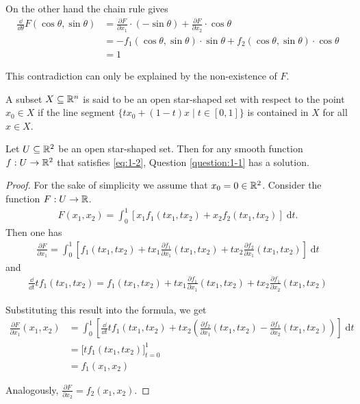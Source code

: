 On the other hand the chain rule gives
\begin{align*}
  \frac{\dd }{\dd\theta} F(\cos\theta, \sin\theta) 
  & = \frac{\partial F}{\partial x_1}\cdot (-\sin\theta) + \frac{\partial F}{\partial x_2}\cdot \cos\theta \\
  & = -f_1 (\cos\theta, \sin\theta)\cdot\sin\theta + f_2(\cos\theta, \sin\theta)\cdot \cos\theta\\
  & = 1
\end{align*}

This contradiction can only be explained by the non-existence of $F$.

\begin{definition}
  A subset $X\subseteq {\ensuremath{\mathbb{R}}}^n$ is said to be an open star-shaped set with respect to the point $x_0\in X$ if
  the line segment $\{tx_0+(1-t)x\mid t\in[0,1]\}$ is contained in $X$ for all $x\in X$.
\end{definition}

\begin{theorem}\label{theorem:1-4}
  Let $U\subseteq {\ensuremath{\mathbb{R}}}^2$ be an open star-shaped set. Then for any smooth function $f:U\to {\ensuremath{\mathbb{R}}}^2$ that satisfies
  \eqref{eq:1-2}, Question \ref{question:1-1} has a solution.
\end{theorem}

\begin{proof}
  For the sake of simplicity we assume that $x_0=0\in{\ensuremath{\mathbb{R}}}^2$. Consider the function $F:U\to {\ensuremath{\mathbb{R}}}$.
  \begin{align*}
    F(x_1, x_2) = \int_{0}^{1}{\left[ x_1f_1(tx_1, tx_2) + x_2f_2(tx_1, tx_2) \right] \;\mathrm{d}t}.
  \end{align*}
Then one has
\begin{align*}
  \frac{\partial F}{\partial x_1} 
  = \int_{0}^{1}{\left[ f_1(tx_1, tx_2) + tx_1\frac{\partial f_1}{\partial x_1}(tx_1, tx_2) + tx_2\frac{\partial f_2}{\partial x_1}(tx_1, tx_2) \right] \;\mathrm{d}t}
\end{align*}
and 
\begin{align*}
  \frac{\dd }{\dd t} tf_1(tx_1, tx_2) = f_1(tx_1, tx_2) + tx_1\frac{\partial f_1}{\partial x_1}(tx_1, tx_2) + tx_2\frac{\partial f_1}{\partial x_2}(tx_1, tx_2)
\end{align*}

Substituting this result into the formula, we get
\begin{align*}
  \frac{\partial F}{\partial x_1}(x_1, x_2)
  & = \int_{0}^{1}{\left[\frac{\dd }{\dd t}tf_1(tx_1, tx_2) + tx_2\left(\frac{\partial f_2}{\partial x_1}(tx_1, tx_2) - \frac{\partial f_1}{\partial x_2}(tx_1, tx_2) \right)\right] \;\mathrm{d}t}\\
  & = \big[t f_1(tx_1, tx_2)\big]_{t=0}^1\\
  & = f_1(x_1, x_2)
\end{align*}

Analogously, $\frac{\partial F }{\partial x_2} = f_2(x_1, x_2)$.
\end{proof}

